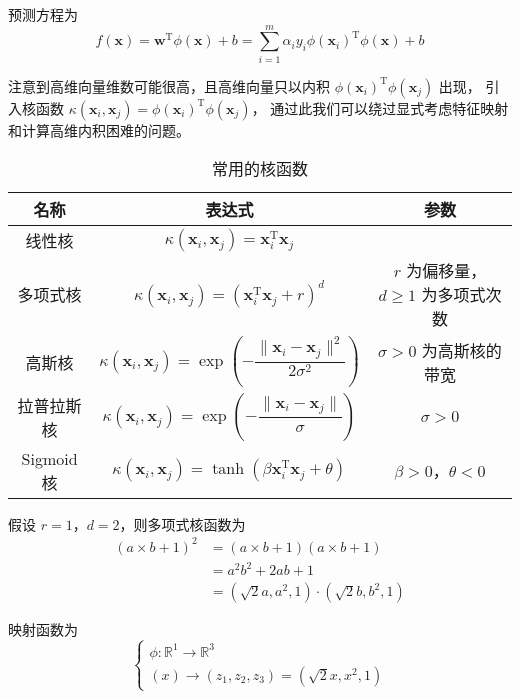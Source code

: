 预测方程为
\begin{equation}
    f(\boldsymbol x) = \boldsymbol w^\mathrm T\phi(\boldsymbol x) + b 
    = \sum_{i = 1}^m\alpha_iy_i\phi(\boldsymbol x_i)^\mathrm T\phi(\boldsymbol x)+b
\end{equation}

注意到高维向量维数可能很高，且高维向量只以内积 $\phi(\boldsymbol{x}_i)^\mathrm T\phi(\boldsymbol{x}_j)$ 出现，
引入核函数 $\kappa(\boldsymbol x_i, \boldsymbol x_j) = \phi(\boldsymbol x_i)^\mathrm T \phi(\boldsymbol x_j)$，
通过此我们可以绕过显式考虑特征映射和计算高维内积困难的问题。

\begin{table}[H]
    \caption{常用的核函数}
    \centering
    \begin{tabular}{|c|c|c|}
        \hline
        名称 & 表达式 & 参数 \\
        \hline
        线性核 & $\kappa(\boldsymbol x_i, \boldsymbol x_j) = \boldsymbol x_i^\mathrm T\boldsymbol x_j$ & \\
        \hline
        多项式核 & $\kappa(\boldsymbol x_i, \boldsymbol x_j) = (\boldsymbol x_i^\mathrm T\boldsymbol x_j + r)^d$ & $r$ 为偏移量，$d \geq 1$ 为多项式次数 \\
        \hline
        高斯核 & $\kappa(\boldsymbol x_i, \boldsymbol x_j) = \exp\left(-\dfrac{\|\boldsymbol x_i - \boldsymbol x_j\|^2}{2\sigma^2}\right)$ & $\sigma > 0$ 为高斯核的带宽 \\
        \hline
        拉普拉斯核 & $\kappa(\boldsymbol x_i, \boldsymbol x_j) = \exp\left(-\dfrac{\|\boldsymbol x_i - \boldsymbol x_j\|}{\sigma}\right)$ & $\sigma > 0$ \\
        \hline
        Sigmoid 核 & $\kappa(\boldsymbol x_i, \boldsymbol x_j) = \tanh(\beta\boldsymbol x_i^\mathrm T\boldsymbol x_j + \theta)$ & $\beta > 0$，$\theta < 0$ \\
        \hline
    \end{tabular}
\end{table}

\begin{example}
    假设 $r = 1$，$d = 2$，则多项式核函数为
\begin{equation}
    \begin{aligned}
        (a \times b + 1)^2 &= (a \times b + 1)(a \times b + 1) \\
        &= a^2b^2 + 2ab + 1 \\
        &= (\sqrt 2a, a^2, 1) \cdot (\sqrt 2b, b^2, 1)
    \end{aligned}
\end{equation}

映射函数为
\begin{equation}
    \begin{cases}
        \phi: \mathbb R^1 \to \mathbb R^3 \\
        (x) \to (z_1, z_2, z_3) = (\sqrt 2x, x^2, 1)
    \end{cases}
\end{equation}
\end{example}

